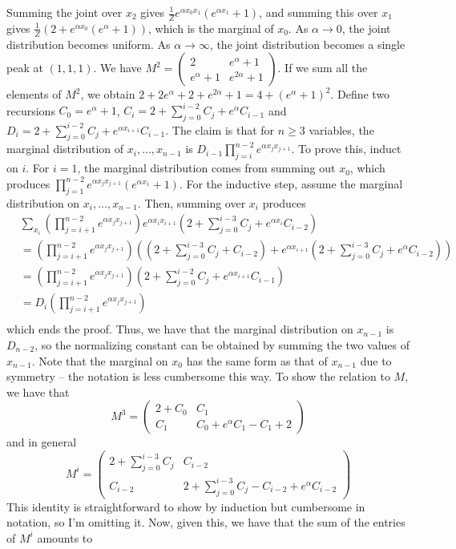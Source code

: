 \documentclass{article}
\newcommand{\openm}{\begin{pmatrix}}
\newcommand{\closem}{\end{pmatrix}}
\begin{document}
Summing the joint over $x_2$ gives $\frac{1}{Z}e^{\alpha x_0x_1}\left(e^{\alpha x_1}+1\right)$, and summing this over $x_1$ gives $\frac{1}{Z}\left(2+e^{\alpha x_0}\left(e^{\alpha}+1\right)\right)$, which is the marginal of $x_0$.
As $\alpha\to0$, the joint distribution becomes uniform. As $\alpha\to\infty$, the joint distribution becomes a single peak at $(1,1,1)$.
We have $M^2=\openm2&e^\alpha+1\\e^\alpha+1&e^{2\alpha}+1\closem$. If we sum all the elements of $M^2$, we obtain $2+2e^\alpha+2+e^{2\alpha}+1=4+\left(e^{\alpha}+1\right)^2$.
Define two recursions $C_0=e^\alpha+1$, $C_i=2+\sum_{j=0}^{i-2}C_{j}+e^\alpha C_{i-1}$ and $D_i=2+\sum_{j=0}^{i-2}C_j+e^{\alpha x_{i+1}}C_{i-1}$. The claim is that for $n\geq3$ variables, the marginal distribution of $x_i,\ldots,x_{n-1}$ is $D_{i-1}\prod_{j=i}^{n-2}e^{\alpha x_jx_{j+1}}$. To prove this, induct on $i$. For $i=1$, the marginal distribution comes from summing out $x_0$, which produces $\prod_{j=1}^{n-2}e^{\alpha x_jx_{j+1}}(e^{\alpha x_1}+1)$. For the inductive step, assume the marginal distribution on $x_i,\ldots,x_{n-1}$. Then, summing over $x_i$ produces
\begin{align*}
    &\sum_{x_i}\left(\prod_{j=i+1}^{n-2}e^{\alpha x_jx_{j+1}}\right)e^{\alpha x_ix_{i+1}}\left(2+\sum_{j=0}^{i-3}C_j+e^{\alpha x_{i}}C_{i-2}\right)\\
    &=\left(\prod_{j=i+1}^{n-2}e^{\alpha x_jx_{j+1}}\right)\left(\left(2+\sum_{j=0}^{i-3}C_j+C_{i-2}\right)+e^{\alpha x_{i+1}}\left(2+\sum_{j=0}^{i-3}C_j+e^{\alpha}C_{i-2}\right)\right)\\
    &=\left(\prod_{j=i+1}^{n-2}e^{\alpha x_jx_{j+1}}\right)\left(2+\sum_{j=0}^{i-2}C_j+e^{\alpha x_{i+1}}C_{i-1}\right)\\
    &=D_i\left(\prod_{j=i+1}^{n-2}e^{\alpha x_jx_{j+1}}\right)\\
\end{align*}
which ends the proof. Thus, we have that the marginal distribution on $x_{n-1}$ is $D_{n-2}$, so the normalizing constant can be obtained by summing the two values of $x_{n-1}$. Note that the marginal on $x_0$ has the same form as that of $x_{n-1}$ due to symmetry -- the notation is less cumbersome this way. To show the relation to $M$, we have that 
\[M^3=\openm 2+C_0&C_1\\C_1&C_0+e^\alpha C_1-C_1+2\closem\]
and in general
\[M^i=\openm 2+\sum_{j=0}^{i-3}C_j&C_{i-2}\\C_{i-2}&2+\sum_{j=0}^{i-3}C_j-C_{i-2}+e^\alpha C_{i-2}\closem\]
This identity is straightforward to show by induction but cumbersome in notation, so I'm omitting it. Now, given this, we have that the sum of the entries of $M^i$ amounts to
\end{document}
